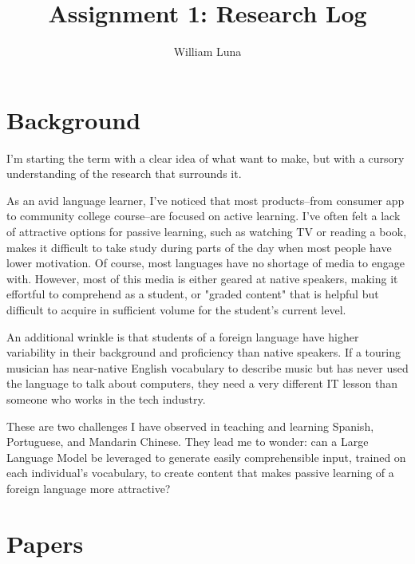 \documentclass[
	letterpaper, %
]{jdf}
\author{William Luna}
\title{Assignment 1: Research Log}
\begin{document}

\maketitle

\section{Background}

I'm starting the term with a clear idea of what want to make, but with a cursory understanding of the research that surrounds it.

As an avid language learner, I've noticed that most products–from consumer app to community college course–are focused on active learning. I've often felt a lack of attractive options for passive learning, such as watching TV or reading a book, makes it difficult to take study during parts of the day when most people have lower motivation. Of course, most languages have no shortage of media to engage with. However, most of this media is either geared at native speakers, making it effortful to comprehend as a student, or "graded content" that is helpful but difficult to acquire in sufficient volume for the student's current level.

An additional wrinkle is that students of a foreign language have higher variability in their background and proficiency than native speakers. If a touring musician has near-native English vocabulary to describe music but has never used the language to talk about computers, they need a very different IT lesson than someone who works in the tech industry.

These are two challenges I have observed in teaching and learning Spanish, Portuguese, and Mandarin Chinese. They lead me to wonder: can a Large Language Model be leveraged to generate easily comprehensible input, trained on each individual's vocabulary, to create content that makes passive learning of a foreign language more attractive?

\section{Papers}
\end{document}
